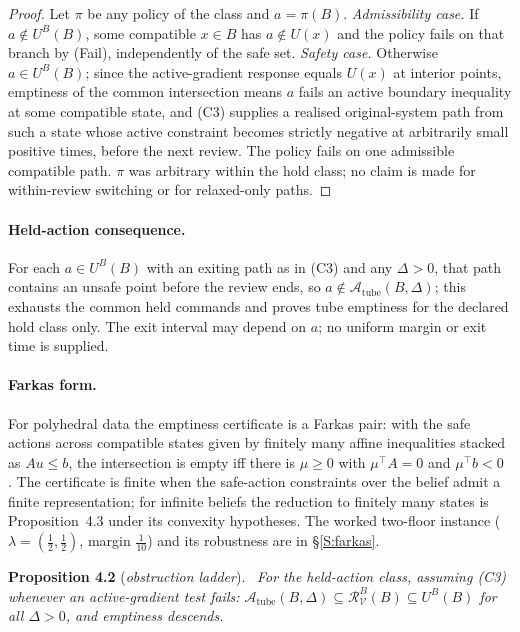 \documentclass[11pt,a4paper]{article}
\theoremstyle{plain}
\theoremstyle{definition}
\theoremstyle{remark}
\newenvironment{restated}[2]{\par\medskip\noindent\textbf{#1} (\textit{#2}).\ \itshape}{\par\medskip}
\newcommand{\cV}{\mathcal{V}}
\newcommand{\cR}{\mathcal{R}}
\newcommand{\cA}{\mathcal{A}}
\newcommand{\Atube}{\cA_{\mathrm{tube}}}
\newcommand{\hyp}[1]{\textup{(#1)}}
\begin{document}
\begin{proof}
Let $\pi$ be any policy of the class and $a=\pi(B)$. \emph{Admissibility case.} If $a\notin U^B(B)$, some compatible $x\in B$ has $a\notin U(x)$ and the policy fails on that branch by (Fail), independently of the safe set. \emph{Safety case.} Otherwise $a\in U^B(B)$; since the active-gradient response equals $U(x)$ at interior points, emptiness of the common intersection means $a$ fails an active boundary inequality at some compatible state, and \hyp{C3} supplies a realised original-system path from such a state whose active constraint becomes strictly negative at arbitrarily small positive times, before the next review. The policy fails on one admissible compatible path. $\pi$ was arbitrary within the hold class; no claim is made for within-review switching or for relaxed-only paths.
\end{proof}

\paragraph{Held-action consequence.} For each $a\in U^B(B)$ with an exiting path as in \hyp{C3} and any $\Delta>0$, that path contains an unsafe point before the review ends, so $a\notin\Atube(B,\Delta)$; this exhausts the common held commands and proves tube emptiness for the declared hold class only. The exit interval may depend on $a$; no uniform margin or exit time is supplied.

\paragraph{Farkas form.} For polyhedral data the emptiness certificate is a Farkas pair: with the safe actions across compatible states given by finitely many affine inequalities stacked as $Au\le b$, the intersection is empty iff there is $\mu\ge0$ with $\mu^\top A=0$ and $\mu^\top b<0$ \citep{farkas1902,gale1960}. The certificate is finite when the safe-action constraints over the belief admit a finite representation; for infinite beliefs the reduction to finitely many states is Proposition~4.3 under its convexity hypotheses. The worked two-floor instance ($\lambda=(\tfrac12,\tfrac12)$, margin $\tfrac1{10}$) and its robustness are in \S\ref{S:farkas}.

\begin{restated}{Proposition 4.2}{obstruction ladder}
For the held-action class, assuming \hyp{C3} whenever an active-gradient test fails: $\Atube(B,\Delta)\subseteq\cR^B_\cV(B)\subseteq U^B(B)$ for all $\Delta>0$, and emptiness descends.
\end{restated}
\end{document}
